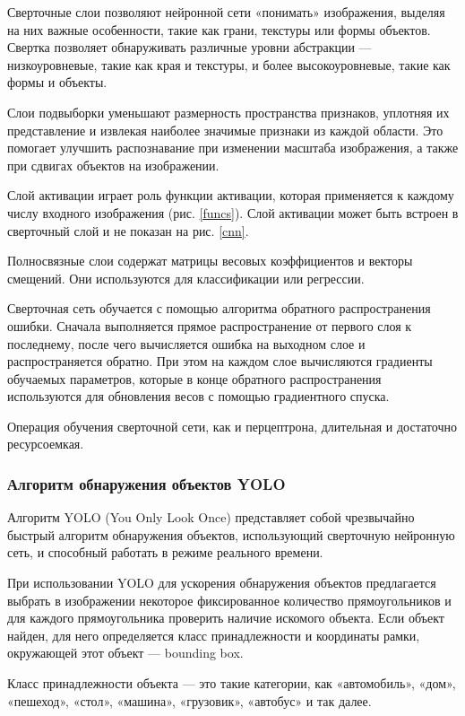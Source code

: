 Сверточные слои позволяют нейронной сети «понимать» изображения, выделяя на них важные особенности, такие как грани, текстуры или формы объектов. Свертка позволяет обнаруживать различные уровни абстракции — низкоуровневые, такие как края и текстуры, и более высокоуровневые, такие как формы и объекты.

Слои подвыборки уменьшают размерность пространства признаков, уплотняя их представление и извлекая наиболее значимые признаки из каждой области. Это помогает улучшить распознавание при изменении масштаба изображения, а также при сдвигах объектов на изображении.

Слой активации играет роль функции активации, которая применяется к каждому числу входного изображения (рис. \ref{funcs}). Слой активации может быть встроен в сверточный слой и не показан на рис. \ref{cnn}.

Полносвязные слои содержат матрицы весовых коэффициентов и векторы смещений. Они используются для классификации или регрессии.

Сверточная сеть обучается с помощью алгоритма обратного распространения ошибки. Сначала выполняется прямое распространение от первого слоя к последнему, после чего вычисляется ошибка на выходном слое и распространяется обратно. При этом на каждом слое вычисляются градиенты обучаемых параметров, которые в конце обратного распространения используются для обновления весов с помощью градиентного спуска.

Операция обучения сверточной сети, как и перцептрона, длительная и достаточно ресурсоемкая.

\subsubsection*{Алгоритм обнаружения объектов YOLO}

Алгоритм YOLO (You Only Look Once) представляет собой чрезвычайно быстрый алгоритм обнаружения объектов, использующий сверточную нейронную сеть, и способный работать в режиме реального времени.

При использовании YOLO для ускорения обнаружения объектов предлагается выбрать в изображении некоторое фиксированное количество прямоугольников и для каждого прямоугольника проверить наличие искомого объекта. Если объект найден, для него определяется класс принадлежности и координаты рамки, окружающей этот объект — bounding box.

Класс принадлежности объекта — это такие категории, как «автомобиль», «дом», «пешеход», «стол», «машина», «грузовик», «автобус» и так далее.

